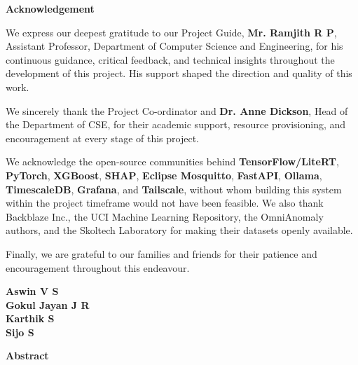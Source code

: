 \documentclass[12pt,a4paper]{report}
\begin{document}
\begin{center}
  {\Large \textbf{Acknowledgement}}\\[0.5cm]
\end{center}
\vspace*{0.3in}

We express our deepest gratitude to our Project Guide, \textbf{Mr. Ramjith R P}, Assistant Professor, Department of Computer Science and Engineering, for his continuous guidance, critical feedback, and technical insights throughout the development of this project. His support shaped the direction and quality of this work.

We sincerely thank the Project Co-ordinator and \textbf{Dr. Anne Dickson}, Head of the Department of CSE, for their academic support, resource provisioning, and encouragement at every stage of this project.

We acknowledge the open-source communities behind \textbf{TensorFlow/LiteRT}, \textbf{PyTorch}, \textbf{XGBoost}, \textbf{SHAP}, \textbf{Eclipse Mosquitto}, \textbf{FastAPI}, \textbf{Ollama}, \textbf{TimescaleDB}, \textbf{Grafana}, and \textbf{Tailscale}, without whom building this system within the project timeframe would not have been feasible. We also thank Backblaze Inc., the UCI Machine Learning Repository, the OmniAnomaly authors, and the Skoltech Laboratory for making their datasets openly available.

Finally, we are grateful to our families and friends for their patience and encouragement throughout this endeavour.

\begin{flushright}
\textbf{\noindent Aswin V S}\\
\textbf{\noindent Gokul Jayan J R}\\
\textbf{\noindent Karthik S}\\
\textbf{\noindent Sijo S}
\end{flushright}
\cleardoublepage

\begin{center}
  {\Large \textbf{Abstract}}\\[0.5cm]
\end{center}
\end{document}

